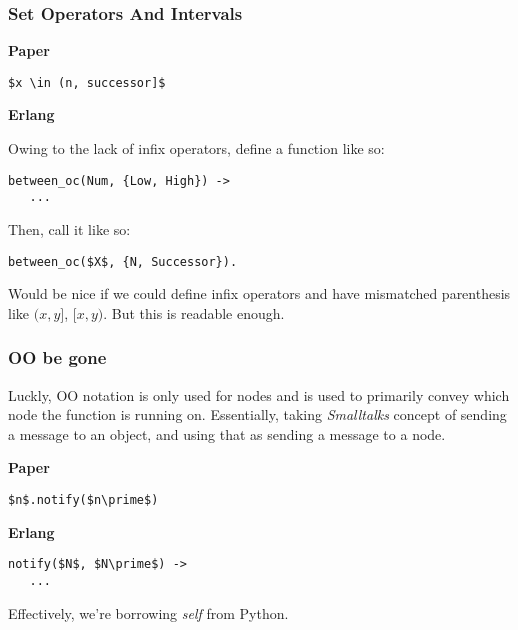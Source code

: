 \documentclass{beamer}
\begin{document}
\begin{frame}[fragile]
  \frametitle{Set Operators And Intervals}

  \begin{multicols}{2}
    \textbf{Paper}
   \begin{lstlisting}[mathescape, style=pesudocode]
$x \in (n, successor]$
    \end{lstlisting}

   \columnbreak

   
   \textbf{Erlang}
   
   Owing to the lack of infix operators, define a function like so:
   \begin{lstlisting}[mathescape, style=erlang]
between_oc(Num, {Low, High}) ->
   ...
   \end{lstlisting}
   Then, call it like so:
   \begin{lstlisting}[mathescape, style=erlang]
between_oc($X$, {N, Successor}).
   \end{lstlisting}
   
  \end{multicols}

  Would be nice if we could define infix operators and have mismatched
  parenthesis like $(x, y]$, $[x, y)$. But this is readable enough.

   
\end{frame}

\begin{frame}[fragile]
  \frametitle{OO be gone}

  Luckly, OO notation is only used for nodes and is used to primarily
  convey which node the function is running on. Essentially, taking
  \emph{Smalltalks} concept of sending a message to an object, and
  using that as sending a message to a node.

  \begin{multicols}{2}
    \textbf{Paper}
   \begin{lstlisting}[mathescape, style=pesudocode]
$n$.notify($n\prime$)
    \end{lstlisting}

   \columnbreak

   \textbf{Erlang}
    \begin{lstlisting}[mathescape, style=erlang]
notify($N$, $N\prime$) ->
   ...
    \end{lstlisting}
  \end{multicols}

  Effectively, we're borrowing \emph{self} from Python.
   
\end{frame}
\end{document}
